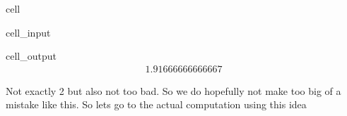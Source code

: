 \documentclass[letterpaper,10pt,english]{jupyterBook}
\begin{document}
\begin{sphinxuseclass}{cell}\begin{sphinxVerbatimInput}

\begin{sphinxuseclass}{cell_input}
\begin{sphinxVerbatim}[commandchars=\\\{\}]
\end{sphinxVerbatim}

\end{sphinxuseclass}\end{sphinxVerbatimInput}
\begin{sphinxVerbatimOutput}

\begin{sphinxuseclass}{cell_output}\begin{equation*}
\begin{split}1.91666666666667\end{split}
\end{equation*}
\end{sphinxuseclass}\end{sphinxVerbatimOutput}

\end{sphinxuseclass}
\sphinxAtStartPar
Not exactly 2 but also not too bad. So we do hopefully not make too big of a mistake like this. So lets go to the actual computation using this idea
\end{document}
